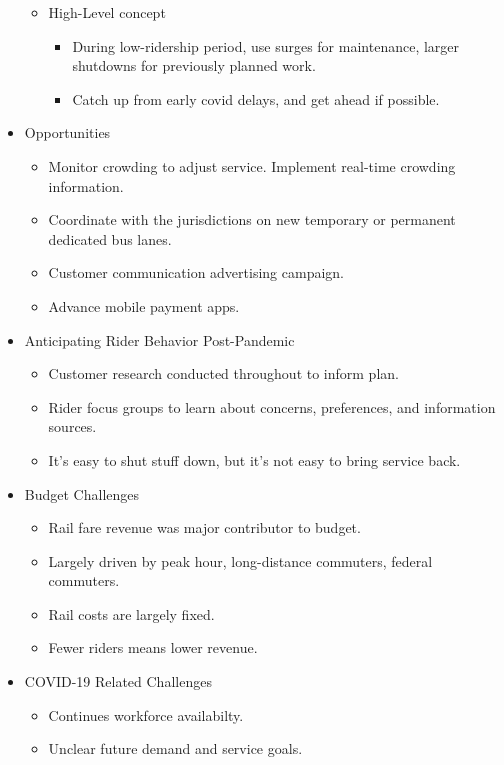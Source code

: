 \documentclass{article}
\begin{document}
\begin{itemize}
\begin{itemize}
        \item High-Level concept
        \begin{itemize}
            \item During low-ridership period, use surges for maintenance, larger shutdowns for previously planned work.
            \item Catch up from early covid delays, and get ahead if possible.
        \end{itemize}
    \end{itemize}
    \item Opportunities
    \begin{itemize}
        \item Monitor crowding to adjust service. Implement real-time crowding information.
        \item Coordinate with the jurisdictions on new temporary or permanent dedicated bus lanes.
        \item Customer communication advertising campaign.
        \item Advance mobile payment apps.
    \end{itemize}
    \item Anticipating Rider Behavior Post-Pandemic
    \begin{itemize}
        \item Customer research conducted throughout to inform plan.
        \item Rider focus groups to learn about concerns, preferences, and information sources.
        \item It's easy to shut stuff down, but it's not easy to bring service back.
    \end{itemize}
    \item Budget Challenges
    \begin{itemize}
        \item Rail fare revenue was major contributor to budget.
        \item Largely driven by peak hour, long-distance commuters, federal commuters.
        \item Rail costs are largely fixed.
        \item Fewer riders means lower revenue.
    \end{itemize}
    \item COVID-19 Related Challenges
    \begin{itemize}
        \item Continues workforce availabilty.
        \item Unclear future demand and service goals.

\end{itemize}
\end{itemize}
\end{document}
